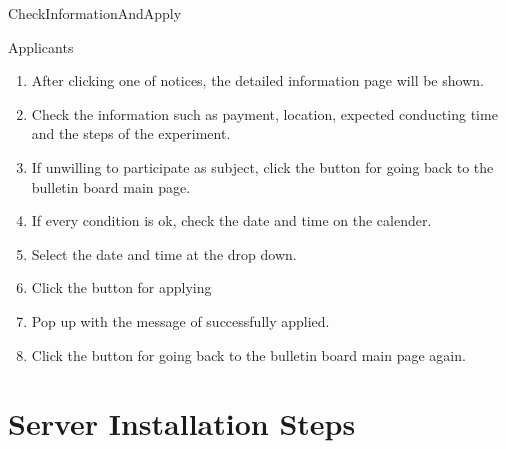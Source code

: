 \documentclass[letterpaper, 10 pt, conference]{ieeeconf}  %
\begin{document}
CheckInformationAndApply\\

Applicants\\

\begin{enumerate}
    \item After clicking one of notices, the detailed information page will be shown.
\item Check the information such as payment, location, expected conducting time and the steps of the experiment.
\item If unwilling to participate as subject, click the button for going back to the bulletin board main page.
\item If every condition is ok, check the date and time on the calender.
\item Select the date and time at the drop down.
\item Click the button for applying
\item Pop up with the message of successfully applied. 
\item Click the button for going back to the bulletin board main page again.
\end{enumerate}



\section{Server Installation Steps}
\end{document}
